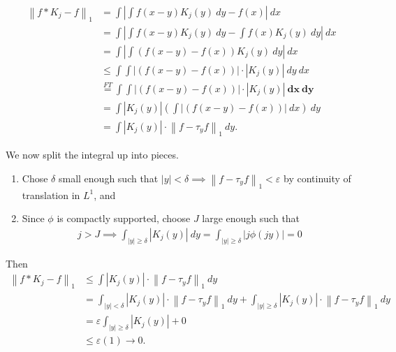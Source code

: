 \begin{solution}
\begin{align*}
{\left\lVert {f\ast K_j - f} \right\rVert}_1 
&= \int {\left\lvert {\int f(x-y) K_j(y) ~dy  - f(x)} \right\rvert}~dx \\
&= \int {\left\lvert {\int f(x-y) K_j(y) ~dy  - \int f(x) K_j(y) ~ dy} \right\rvert}~dx \\
&= \int {\left\lvert {\int ( f(x-y) - f(x) ) K_j(y) ~dy } \right\rvert} ~dx \\
&\leq \int \int {\left\lvert {(f(x-y) - f(x))} \right\rvert} \cdot {\left\lvert {K_j(y)} \right\rvert} ~ dy~dx \\
&\overset{FT}= \int \int {\left\lvert {(f(x-y) - f(x))} \right\rvert} \cdot {\left\lvert {K_j(y)} \right\rvert} \mathbf{~ dx~dy}\\
&= \int {\left\lvert {K_j(y)} \right\rvert} \left( \int {\left\lvert {(f(x-y) - f(x))} \right\rvert}  ~ dx\right) ~dy \\
&= \int {\left\lvert {K_j(y)} \right\rvert} \cdot {\left\lVert {f - \tau_y f} \right\rVert}_1 ~dy
.\end{align*}

We now split the integral up into pieces.

\begin{enumerate}
\def\labelenumi{\arabic{enumi}.}
\item
  Chose \(\delta\) small enough such that
  \({\left\lvert {y} \right\rvert} < \delta \implies {\left\lVert {f - \tau_y f} \right\rVert}_1 < \varepsilon\)
  by continuity of translation in \(L^1\), and
\item
  Since \(\phi\) is compactly supported, choose \(J\) large enough such
  that
  \begin{align*}
  j > J \implies \int_{{\left\lvert {y} \right\rvert} \geq \delta} {\left\lvert {K_j(y)} \right\rvert} ~dy 
  = \int_{{\left\lvert {y} \right\rvert} \geq \delta} {\left\lvert {j\phi(jy)} \right\rvert} = 0
  \end{align*}
\end{enumerate}

Then
\begin{align*}
{\left\lVert {f\ast K_j - f} \right\rVert}_1 
&\leq 
\int {\left\lvert {K_j(y)} \right\rvert} \cdot {\left\lVert {f - \tau_y f} \right\rVert}_1 ~dy \\
&= \int_{{\left\lvert {y} \right\rvert} < \delta} {\left\lvert {K_j(y)} \right\rvert} \cdot {\left\lVert {f - \tau_y f} \right\rVert}_1 ~dy 
+ \int_{{\left\lvert {y} \right\rvert} \geq  \delta} {\left\lvert {K_j(y)} \right\rvert} \cdot {\left\lVert {f - \tau_y f} \right\rVert}_1 ~dy \\
&= \varepsilon \int_{{\left\lvert {y} \right\rvert} \geq  \delta} {\left\lvert {K_j(y)} \right\rvert} + 0 \\
&\leq \varepsilon(1) \to 0
.\end{align*}

\end{solution}

